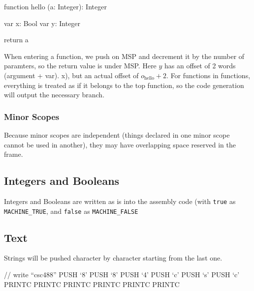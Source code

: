   \begin{code}
  function hello (a: Integer): Integer
  {
    var x: Bool
    var y: Integer
   
    return a
  }
  \end{code}

  When entering a function, we push on MSP and decrement it by the number of
  paramters, so the return value is under MSP.
  Here $y$ has an offset of 2 words (argument + var).
  x), but an actual offset of $o_{\text{hello}} + 2$.
  For functions in functions, everything is treated as if it belongs to the top
  function, so the code generation will output the necessary branch.
\subsubsection{Minor Scopes}
  Because minor scopes are independent (things declared in one minor scope
  cannot be used in another), they may have overlapping space reserved in the
  frame.
\subsection{Integers and Booleans}
  Integers and Booleans are written as is into the assembly code (with
  \texttt{true} as \texttt{MACHINE\_TRUE}, and \texttt{false} as
  \texttt{MACHINE\_FALSE}
\subsection{Text}
  Strings will be pushed character by character starting from the last one.
  \begin{code}[Text]
    // write ``csc488''
    PUSH `8'
    PUSH `8'
    PUSH `4'
    PUSH `c'
    PUSH `s'
    PUSH `c'
    PRINTC
    PRINTC
    PRINTC
    PRINTC
    PRINTC
    PRINTC
  \end{code}
